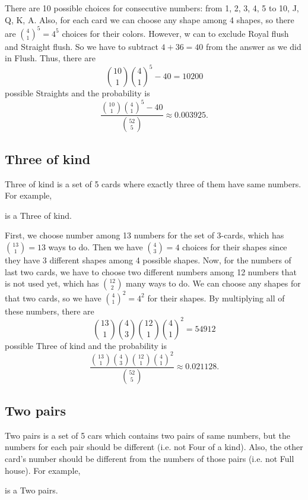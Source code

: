 \documentclass{article}
\begin{document}
There are 10 possible choices for consecutive numbers: from 1, 2, 3, 4, 5 to 10, J, Q, K, A. 
Also, for each card we can choose any shape among 4 shapes, so there are $\binom{4}{1}^{5} =4^{5}$ choices for their colors. 
However, w can to exclude Royal flush and Straight flush. So we have to subtract $4 + 36 = 40$ from the answer as we did in Flush. 
Thus, there are
$$
\binom{10}{1} \binom{4}{1}^{5} - 40 = 10200
$$
possible Straights and the probability is 
$$
\frac{\binom{10}{1}\binom{4}{1}^{5} - 40}{\binom{52}{5}} \approx 0.003925. 
$$





\subsection*{Three of kind}

Three of kind is a set of 5 cards where exactly three of them have same numbers. For example, 
\begin{center}
{ \Jh{} \Jd{} \Jc{} \fourh{} \fiveh}
\end{center}
is a Three of kind. 

First, we choose number among 13 numbers  for the set of 3-cards, which has $\binom{13}{1} =13$ ways to do. 
Then we have $\binom{4}{3} = 4$ choices for their shapes since they have 3 different shapes among 4 possible shapes. 
Now, for the numbers of last two cards,  we have to choose two different numbers among 12 numbers that is not used yet, which has $\binom{12}{2}$ many ways to do. 
We can choose any shapes for that two cards, so we have $\binom{4}{1}^{2} = 4^{2}$ for their shapes. 
By multiplying all of these numbers, there are
$$
\binom{13}{1}\binom{4}{3} \binom{12}{1}\binom{4}{1}^{2} = 54912
$$
possible Three of kind and the probability is 
$$
\frac{\binom{13}{1}\binom{4}{3} \binom{12}{1}\binom{4}{1}^{2} }{\binom{52}{5}} \approx 0.021128.
$$


\subsection*{Two pairs}
Two pairs is a set of 5 cars which contains two pairs of same numbers, but the numbers for each pair should be different (i.e. not Four of a kind). Also, the other card's number should be different from the numbers of those pairs (i.e. not Full house).  
For example, 
\begin{center}
{ \Qh{} \Qc{} \Ks{} \Kc{} \sevs{}}
\end{center}
is a Two pairs. 
\end{document}

